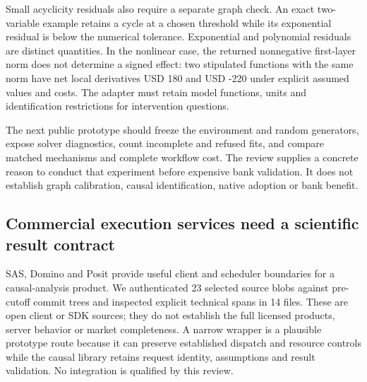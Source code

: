 Small acyclicity residuals also require a separate graph check. An exact
two-variable example retains a cycle at a chosen threshold while its
exponential residual is below the numerical tolerance. Exponential and
polynomial residuals are distinct quantities. In the nonlinear case, the
returned nonnegative first-layer norm does not determine a signed
effect: two stipulated functions with the same norm have net local
derivatives USD 180 and USD -220 under explicit assumed values and
costs. The adapter must retain model functions, units and identification
restrictions for intervention questions.\citep{exec23_notears_reference}

The next public prototype should freeze the environment and random
generators, expose solver diagnostics, count incomplete and refused
fits, and compare matched mechanisms and complete workflow cost. The
review supplies a concrete reason to conduct that experiment before
expensive bank validation. It does not establish graph calibration,
causal identification, native adoption or bank
benefit.\citep{exec23_notears_source,exec23_notears_reference}

\hypertarget{commercial-execution-services-need-a-scientific-result-contract}{%
\subsection{Commercial execution services need a scientific result
contract}\label{commercial-execution-services-need-a-scientific-result-contract}}

SAS, Domino and Posit provide useful client and scheduler boundaries for
a causal-analysis product. We authenticated 23 selected source blobs
against pre-cutoff commit trees and inspected explicit technical spans
in 14 files. These are open client or SDK sources; they do not establish
the full licensed products, server behavior or market completeness. A
narrow wrapper is a plausible prototype route because it can preserve
established dispatch and resource controls while the causal library
retains request identity, assumptions and result validation. No
integration is qualified by this review.
\citep{exec23_workflow_sasctl,exec23_workflow_dominopy,exec23_workflow_connectapi,exec23_workflow_positgo}

